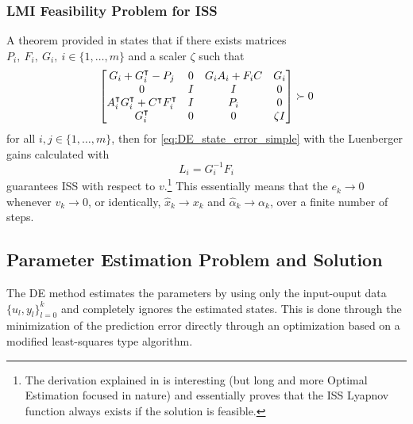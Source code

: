 \documentclass[]{article}
\begin{document}
\subsubsection{LMI Feasibility Problem for ISS}
A theorem provided in \cite{heemels2010} states that if there exists matrices $P_i,\ F_i,\ G_i,\ i \in \{1, \dots, m\}$ and a scaler $\zeta$ such that
\begin{equation}
	\mqty[G_i + G_i^\intercal - P_j			&0	&G_i A_i + F_i C	&G_i\\
		  0							&I	&I					&0\\
		  A_i^\intercal G_i^\intercal + C^\intercal F_i^\intercal	&I	&P_i				&0\\
		  G_i^\intercal						&0	&0					&\zeta I]
		  \succ 0
\end{equation}
for all $i, j \in \{1,\dots,m\}$, then for \eqref{eq:DE_state_error_simple} with the Luenberger gains calculated with
\begin{equation}
	L_i = G_i^{-1} F_i
\end{equation}
guarantees ISS with respect to $v$.\footnote{The derivation explained in \cite{heemels2010} is interesting (but long and more Optimal Estimation focused in nature) and essentially proves that the ISS Lyapnov function always exists if the solution is feasible.}
This essentially means that the $e_k \to 0$ whenever $v_k \to 0$, or identically, $\hat{x}_k \to x_k$ and $\hat{\alpha}_k \to \alpha_k$, over a finite number of steps.

\subsection{Parameter Estimation Problem and Solution}
The DE method estimates the parameters by using only the input-ouput data $\{u_l , y_l\}_{l=0}^k$ and completely ignores the estimated states. This is done through the minimization of the prediction error directly through an optimization based on a modified least-squares type algorithm.
\end{document}
